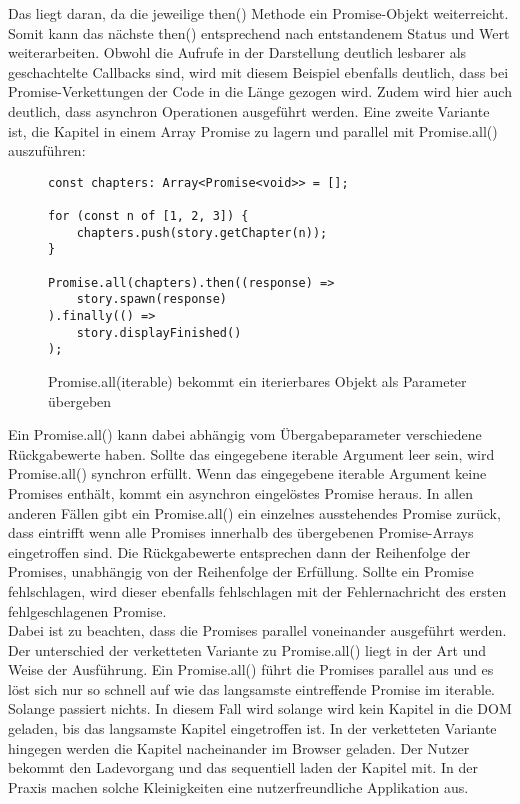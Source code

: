 \noindent
Das liegt daran, da die jeweilige then() Methode ein Promise-Objekt weiterreicht. Somit kann das nächste then() entsprechend nach entstandenem Status und Wert weiterarbeiten. Obwohl die Aufrufe in der Darstellung deutlich lesbarer als geschachtelte Callbacks sind, wird mit diesem Beispiel ebenfalls deutlich, dass bei Promise-Verkettungen der Code in die Länge gezogen wird. Zudem wird hier auch deutlich, dass asynchron Operationen ausgeführt werden. Eine zweite Variante ist, die Kapitel in einem Array Promise zu lagern und parallel mit Promise.all() auszuführen: 

\begin{figure}[H]
\begin{lstlisting}[basicstyle=\small]
const chapters: Array<Promise<void>> = [];

for (const n of [1, 2, 3]) {
    chapters.push(story.getChapter(n));
}

Promise.all(chapters).then((response) =>
    story.spawn(response)
).finally(() =>
    story.displayFinished()
);
\end{lstlisting}
\caption{Promise.all(iterable) bekommt ein iterierbares Objekt als Parameter übergeben}
\label{Promise-all-example}
\end{figure}

\noindent
Ein Promise.all() kann dabei abhängig vom Übergabeparameter verschiedene Rückgabewerte haben. Sollte das eingegebene iterable Argument leer sein, wird Promise.all() synchron erfüllt. Wenn das eingegebene iterable Argument keine Promises enthält, kommt ein asynchron eingelöstes Promise heraus. In allen anderen Fällen gibt ein Promise.all() ein einzelnes ausstehendes Promise zurück, dass eintrifft wenn alle Promises innerhalb des übergebenen Promise-Arrays eingetroffen sind. Die Rückgabewerte entsprechen dann der Reihenfolge der Promises, unabhängig von der Reihenfolge der Erfüllung\cite{promise-all}. Sollte ein Promise fehlschlagen, wird dieser ebenfalls fehlschlagen mit der Fehlernachricht des ersten fehlgeschlagenen Promise\cite{promise-executor}.\\

\noindent
Dabei ist zu beachten, dass die Promises parallel voneinander ausgeführt werden. Der unterschied der verketteten Variante zu Promise.all() liegt in der Art und Weise der Ausführung. Ein Promise.all() führt die Promises parallel aus und es löst sich nur so schnell auf wie das langsamste eintreffende Promise im iterable. Solange passiert nichts. In diesem Fall wird solange wird kein Kapitel in die DOM geladen, bis das langsamste Kapitel eingetroffen ist. In der verketteten Variante hingegen werden die Kapitel nacheinander im Browser geladen. Der Nutzer bekommt den Ladevorgang und das sequentiell laden der Kapitel mit. In der Praxis machen solche Kleinigkeiten eine nutzerfreundliche Applikation aus. 

